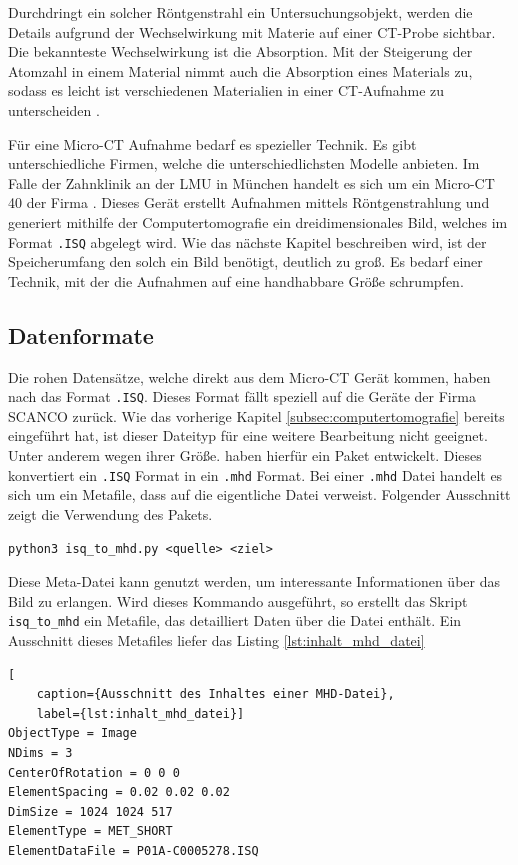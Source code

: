 Durchdringt ein solcher Röntgenstrahl ein Untersuchungsobjekt, werden die
Details aufgrund der Wechselwirkung mit Materie auf einer CT-Probe sichtbar. Die
bekannteste Wechselwirkung ist die Absorption. Mit der Steigerung der Atomzahl
in einem Material nimmt auch die Absorption eines Materials zu, sodass es leicht
ist verschiedenen Materialien in einer CT-Aufnahme zu unterscheiden \citep[vgl.][]{nib2024}.

Für eine Micro-CT Aufnahme bedarf es spezieller Technik. Es gibt unterschiedliche
Firmen, welche die unterschiedlichsten Modelle anbieten. Im Falle der Zahnklinik
an der LMU in München handelt es sich um ein Micro-CT 40 der Firma \citet{scanco2024}.
Dieses Gerät erstellt Aufnahmen mittels Röntgenstrahlung und generiert mithilfe der
Computertomografie ein dreidimensionales Bild, welches im Format \texttt{.ISQ} abgelegt
wird. Wie das nächste Kapitel beschreiben wird, ist der Speicherumfang den solch
ein Bild benötigt, deutlich zu groß. Es bedarf einer Technik, mit der die
Aufnahmen auf eine handhabbare Größe schrumpfen.

\subsection{Datenformate}
\label{subsec:datensätze} Die rohen Datensätze, welche direkt aus dem Micro-CT Gerät
kommen, haben nach \citet{scanco2024} das Format \texttt{.ISQ}. Dieses Format fällt
speziell auf die Geräte der Firma SCANCO zurück. Wie das vorherige Kapitel
\ref{subsec:computertomografie} bereits eingeführt hat, ist dieser Dateityp für eine
weitere Bearbeitung nicht geeignet. Unter anderem wegen ihrer Größe. \citet{RoeschKunzelmann2018}
haben hierfür ein Paket entwickelt. Dieses konvertiert ein \texttt{.ISQ} Format
in ein \texttt{.mhd} Format. Bei einer \texttt{.mhd} Datei handelt es sich um ein
Metafile, dass auf die eigentliche Datei verweist. Folgender Ausschnitt zeigt die
Verwendung des Pakets.

\texttt{python3 isq\_to\_mhd.py <quelle> <ziel>}

Diese Meta-Datei kann genutzt werden, um interessante Informationen über das
Bild zu erlangen. Wird dieses Kommando ausgeführt, so erstellt das Skript
\texttt{isq\_to\_mhd} ein Metafile, das detailliert Daten über die Datei enthält.
Ein Ausschnitt dieses Metafiles liefer das Listing \ref{lst:inhalt_mhd_datei}

\begin{lstlisting}[
	caption={Ausschnitt des Inhaltes einer MHD-Datei},
	label={lst:inhalt_mhd_datei}]
ObjectType = Image
NDims = 3
CenterOfRotation = 0 0 0
ElementSpacing = 0.02 0.02 0.02
DimSize = 1024 1024 517
ElementType = MET_SHORT
ElementDataFile = P01A-C0005278.ISQ
\end{lstlisting}


